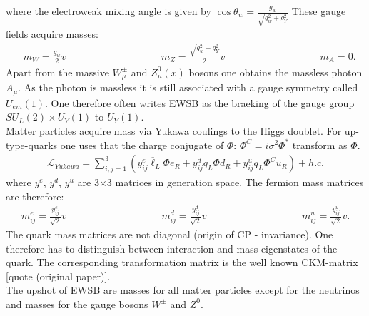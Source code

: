 where the electroweak mixing angle is given by $\cos\theta_w = \frac{g_w}{\sqrt{g_w^2 + g_Y^2}}$
These gauge fields acquire masses:
\begin{align}
& m_W = \frac{g_w}{2} v \hspace{4cm} m_Z = \frac{\sqrt{g_w^2+g_Y^2}}{2} v \hspace{4cm} m_A = 0.
\end{align}
Apart from the massive  $W^\pm_\mu$ and $Z^0_\mu(x)$ bosons one obtains the massless photon $A_\mu$. As the photon is massless it is still associated with a gauge symmetry called $U_{em}(1)$. One therefore often writes EWSB as the braeking of the gauge group $SU_L(2) \times U_Y(1)$ to $U_Y(1)$.\\
Matter particles acquire mass via Yukawa coulings to the Higgs doublet. For up-type-quarks one uses that the charge conjugate of $\Phi$: $\Phi^C = i \sigma^2 \Phi^\ast$ transform as $\Phi$.
\begin{align}
\mathcal{L}_{Yukawa} = \sum_{i,j=1}^3 \left( y_{ij}^e \overline{\ell}_L \Phi e_R  + y_{ij}^d \overline{q}_L \Phi d_R + y_{ij}^u \overline{q}_L \Phi^C u_R\right) + h.c. 
\end{align}
where $y^e$, $y^d$, $y^u$ are 3$\times$3 matrices in generation space. The fermion mass matrices are therefore:
\begin{align}
m^e_{ij} = \frac{y^e_{ij}}{\sqrt{2}} v  \hspace{4cm} m^d_{ij} = \frac{y^d_{ij}}{\sqrt{2}} v \hspace{4cm} m^u_{ij} = \frac{y^u_{ij}}{\sqrt{2}} v.
\end{align}
The quark mass matrices are not diagonal (origin of CP - invariance). One therefore has to distinguish between interaction and mass eigenstates of the quark. The corresponding transformation matrix is the well known CKM-matrix [quote (original paper)].\\
The upshot of EWSB are masses for all matter particles except for the neutrinos and masses for the gauge bosons $W^\pm$ and $Z^0$.

